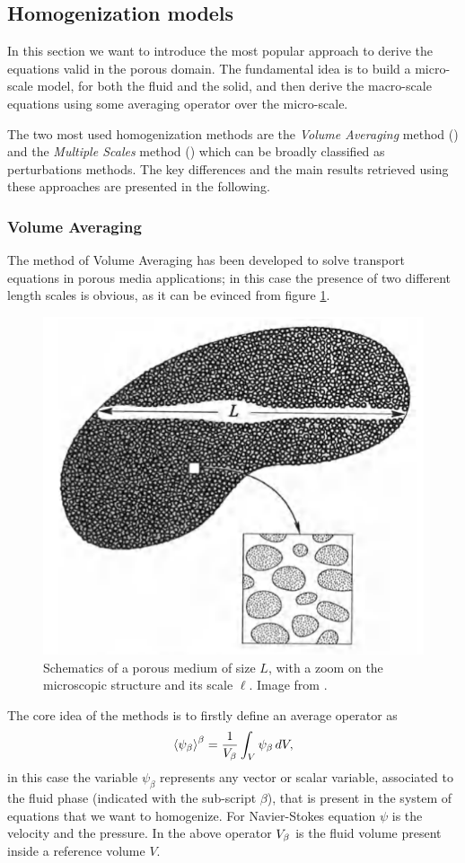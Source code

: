 \subsection{Homogenization models}

In this section we want to introduce the most popular approach to derive the equations valid in the porous domain.
The fundamental idea is to build a micro-scale model, for both the fluid and the solid, and then derive the macro-scale equations using some averaging operator over the micro-scale.

The two most used homogenization methods are the \textit{Volume Averaging} method (\citet{whitaker2013method}) and the \textit{Multiple Scales} method (\citet{mei2010homogenization}) which can be broadly classified as perturbations methods. 
The key differences and the main results retrieved using these approaches are presented in the following.


\subsubsection{Volume Averaging}
\label{sec:vans}

The method of Volume Averaging has been developed to solve transport equations in porous media applications; in this case the presence of two different length scales is obvious, as it can be evinced from figure \ref{fig:porsystem}.
	
	\begin{figure}[h]
		\centering
		\includegraphics[width=0.5\linewidth]{chapter_1/por_system}
		\caption{Schematics of a porous medium of size $L$, with a zoom on the microscopic structure and its scale $\ell$. Image from \citet{whitaker2013method}.}
		\label{fig:porsystem}
	\end{figure}

The core idea of the methods is to firstly define an average operator as $${\left< \psi_{\beta} \right>}^{\beta} = \dfrac{1}{V_\beta} \displaystyle\int_{V} \psi_{\beta} \, dV,$$ in this case the variable $\psi_{\beta}$ represents any vector or scalar variable, associated to the fluid phase (indicated with the sub-script $\beta$), that is present in the system of equations that we want to homogenize. For Navier-Stokes equation $\psi$ is the velocity and the pressure. In the above operator $V_\beta$ is the fluid volume present inside a reference volume $V$.

